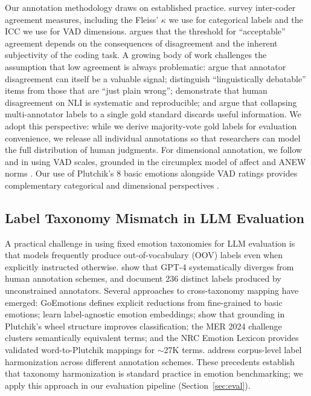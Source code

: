 \documentclass[twoside,11pt]{article}
\begin{document}
Our annotation methodology draws on established practice. \citet{artstein2008inter} survey inter-coder agreement measures, including the Fleiss' $\kappa$ \citep{fleiss1971measuring} we use for categorical labels and the ICC \citep{shrout1979intraclass} we use for VAD dimensions. \citet{krippendorff2018content} argues that the threshold for ``acceptable'' agreement depends on the consequences of disagreement and the inherent subjectivity of the coding task. A growing body of work challenges the assumption that low agreement is always problematic: \citet{passonneau2014benefits} argue that annotator disagreement can itself be a valuable signal; \citet{plank2014linguistically} distinguish ``linguistically debatable'' items from those that are ``just plain wrong''; \citet{pavlick2019inherent} demonstrate that human disagreement on NLI is systematic and reproducible; and \citet{uma2021learning} argue that collapsing multi-annotator labels to a single gold standard discards useful information. We adopt this perspective: while we derive majority-vote gold labels for evaluation convenience, we release all individual annotations so that researchers can model the full distribution of human judgments. For dimensional annotation, we follow \citet{warriner2013norms} and \citet{mohammad2018obtaining} in using VAD scales, grounded in the circumplex model of affect \citep{russell1980circumplex,mehrabian1996pleasure} and ANEW norms \citep{bradley1999affective}. Our use of Plutchik's 8 basic emotions \citep{plutchik1980general,plutchik2001nature} alongside VAD ratings provides complementary categorical and dimensional perspectives \citep{buechel2017emobank}.

\subsection{Label Taxonomy Mismatch in LLM Evaluation}

A practical challenge in using fixed emotion taxonomies for LLM evaluation is that models frequently produce out-of-vocabulary (OOV) labels even when explicitly instructed otherwise. \citet{niu2024rethinking} show that GPT-4 systematically diverges from human annotation schemes, and \citet{lian2025ovmer} document 236 distinct labels produced by unconstrained annotators. Several approaches to cross-taxonomy mapping have emerged: GoEmotions \citep{demszky2020goemotions} defines explicit reductions from fine-grained to basic emotions; \citet{buechel2021label} learn label-agnostic emotion embeddings; \citet{lim2024plutchik} show that grounding in Plutchik's wheel structure improves classification; the MER 2024 challenge \citep{lian2024mer} clusters semantically equivalent terms; and the NRC Emotion Lexicon \citep{mohammad2012semeval} provides validated word-to-Plutchik mappings for $\sim$27K terms. \citet{buechel2016corpus} address corpus-level label harmonization across different annotation schemes. These precedents establish that taxonomy harmonization is standard practice in emotion benchmarking; we apply this approach in our evaluation pipeline (Section~\ref{sec:eval}).
\end{document}
